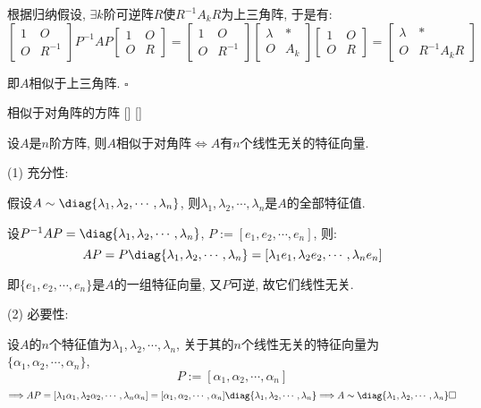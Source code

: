 \documentclass[UTF8]{ctexart}
\begin{document}
\begin{prf}
			根据归纳假设, $\exists k$阶可逆阵$R$使$R^{-1}A_{k}R$为上三角阵, 于是有: 
			\[\begin{bmatrix}
				1 & O\\
				O & R^{-1}
			\end{bmatrix}
			P^{-1}AP
			\begin{bmatrix}
				1 & O\\
				O & R
			\end{bmatrix}=
			\begin{bmatrix}
				1 & O\\
				O & R^{-1}
			\end{bmatrix}
			\begin{bmatrix}
				\lambda & *\\
				O & A_{k}
			\end{bmatrix}
			\begin{bmatrix}
				1 & O\\
				O & R
			\end{bmatrix}=
			\begin{bmatrix}
				\lambda & *\\
				O & R^{-1}A_k R
			\end{bmatrix}\]

			即$A$相似于上三角阵. $\square$
		\end{prf}
	
		\begin{thm}
			[]
			{相似于对角阵的方阵}
			[]
			[]

			设$A$是$n$阶方阵, 则$A$相似于对角阵$\iff A$有$n$个线性无关的特征向量. 
		\end{thm}

        \begin{prf}

			(1) 充分性: 
			
			假设$A\sim\diag\{\lambda_1,\lambda_2,\cdots,\lambda_n\}$, 则$\lambda_1,\lambda_2,\cdots,\lambda_n$是$A$的全部特征值. 

			设$P^{-1}AP=\diag\{\lambda_1,\lambda_2,\cdots,\lambda_n\}$, $P:=[e_1,e_2,\cdots,e_n]$, 则: 
			\[AP=P\diag\{\lambda_1,\lambda_2,\cdots,\lambda_n\}=[\lambda_1 e_1,\lambda_2 e_2,\cdots,\lambda_n e_n]\]

			即$\{e_1,e_2,\cdots,e_n\}$是$A$的一组特征向量, 又$P$可逆, 故它们线性无关. 

			(2) 必要性: 
			
			设$A$的$n$个特征值为$\lambda_1,\lambda_2,\cdots,\lambda_n$, 关于其的$n$个线性无关的特征向量为$\{\alpha_1,\alpha_2,\cdots,\alpha_n\}$, 
			\[P:=[\alpha_1,\alpha_2,\cdots,\alpha_n]\]
			\[\Longrightarrow AP=[\lambda_1\alpha_1,\lambda_2\alpha_2,\cdots,\lambda_n\alpha_n]=[\alpha_1,\alpha_2,\cdots,\alpha_n]\diag\{\lambda_1,\lambda_2,\cdots,\lambda_n\}\Longrightarrow A\sim\diag\{\lambda_1,\lambda_2,\cdots,\lambda_n\}\square\]
        \end{prf}
		
\end{document}
